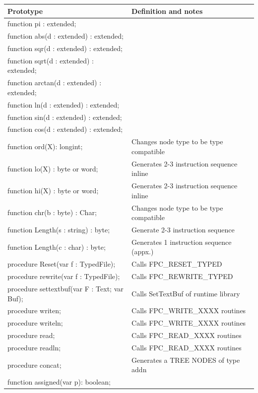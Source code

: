 \documentclass [a4paper,12pt]{article}
\begin{document}
\begin{longtable}{|l|l|}
\hline
Prototype& Definition and notes \\
\hline
\endhead
\hline
\endfoot
\textsf{function pi : extended;}& \\
\textsf{function abs(d : extended) : extended;}& \\
\textsf{function sqr(d : extended) : extended;}& \\
\textsf{function sqrt(d : extended) : extended;}& \\
\textsf{function arctan(d : extended) : extended;}& \\
\textsf{function ln(d : extended) : extended;}& \\
\textsf{function sin(d : extended) : extended;}& \\
\textsf{function cos(d : extended) : extended;}& \\
\textsf{function ord(X): longint;}&
   Changes node type to be type compatible \\
\textsf{function lo(X) : byte or word;}&
   Generates 2-3 instruction sequence inline \\
\textsf{function hi(X) : byte or word;}&
   Generates 2-3 instruction sequence inline \\
\textsf{function chr(b : byte) : Char;}&
   Changes node type to be type compatible \\
\textsf{function Length(s : string) : byte;}&
   Generate 2-3 instruction sequence \\
\textsf{function Length(c : char) : byte;}&
   Generates 1 instruction sequence (appx.) \\
\textsf{procedure Reset(var f : TypedFile);}&
   Calls FPC{\_}RESET{\_}TYPED \\
\textsf{procedure rewrite(var f : TypedFile);}&
   Calls FPC{\_}REWRITE{\_}TYPED \\
\textsf{procedure settextbuf(var F : Text; var Buf);}&
   Calls SetTextBuf of runtime library \\
\textsf{procedure writen;}&
   Calls FPC{\_}WRITE{\_}XXXX routines \\
\textsf{procedure writeln;}&
   Calls FPC{\_}WRITE{\_}XXXX routines \\
\textsf{procedure read;}&
   Calls FPC{\_}READ{\_}XXXX routines \\
\textsf{procedure readln;}&
   Calls FPC{\_}READ{\_}XXXX routines \\
\textsf{procedure concat;}&
   Generates a TREE NODES of type addn \\
\textsf{function assigned(var p): boolean;}&

\end{longtable}
\end{document}
